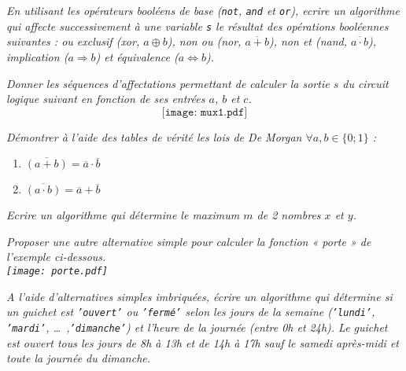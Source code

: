 \begin{td}\label{td:booleens1}
\em
En utilisant les opérateurs booléens de base ({\tt not}, {\tt and} et {\tt or}),
ecrire un algorithme qui affecte successivement à une variable {\tt s} 
le résultat des opérations booléennes suivantes :
ou exclusif ({\em xor}, $a \oplus b$), 
non ou ({\em nor}, $\overline{a+b}$), 
non et ({\em nand}, $\overline{a\cdot b}$), 
implication ($a \Rightarrow b$) et  
équivalence ($a \Leftrightarrow b$).
\end{td}

\begin{td}\label{td:circuits}
\em
Donner les séquences d'affectations permettant de calculer la sortie $s$
du circuit logique suivant en fonction de ses entrées $a$, $b$ et $c$.
$$\texttt{[image: mux1.pdf]}$$
\end{td}

\begin{td}\label{td:prop}
\em
Démontrer à l'aide des tables de vérité les lois de De Morgan 
$\forall a, b \in \{0;1\}$ :
\begin{enumerate}
\item {$\overline{(a+b)} = \overline{a} \cdot \overline{b}$} 
\item {$\overline{(a \cdot b)} = \overline{a} + \overline{b}$}
\end{enumerate}
\end{td}


\begin{td}\label{td:max}
\em
Ecrire un algorithme qui détermine le maximum $m$ de 2 nombres $x$ et $y$.
\end{td}

\begin{td}\label{td:porte}
\em
Proposer une autre alternative simple pour calculer la fonction « porte » de
l'exemple ci-dessous.\\
\texttt{[image: porte.pdf]}
\end{td}

\begin{td}\label{td:guichet}
\em
A l'aide d'alternatives simples imbriquées, écrire un algorithme qui détermine 
si un guichet est {\tt 'ouvert'} ou 
{\tt 'fermé'} selon les jours de la semaine ({\tt 'lundi'}, {\tt 'mardi'},
\ldots\ ,{\tt 'dimanche'}) et l'heure de la journée (entre 0h et 24h).
Le guichet est ouvert tous les jours de 8h à 13h et de 14h à 17h 
sauf le samedi après-midi et toute la journée du dimanche.
\end{td}

